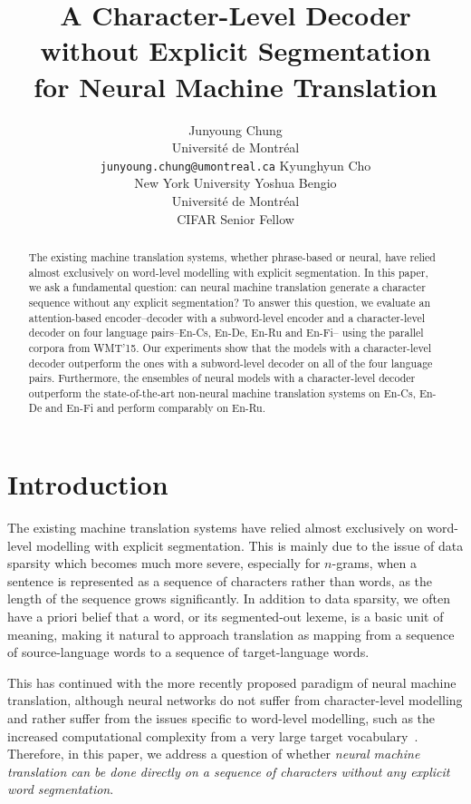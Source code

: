 \documentclass[11pt]{article}
\title{A Character-Level Decoder without Explicit Segmentation\\ 
       for Neural Machine Translation}
\author{Junyoung Chung \\
        Universit\'e de Montr\'eal \\
        {\small \texttt{junyoung.chung@umontreal.ca}}
	  \And
	Kyunghyun Cho \\
    New York University 
	  \And
	Yoshua Bengio \\
    Universit\'e de Montr\'eal \\
    CIFAR Senior Fellow
  }
\date{}
\begin{document}
\maketitle
\vspace*{-7mm}
\begin{abstract}
    The existing machine translation systems, whether phrase-based or neural,
    have relied almost exclusively on word-level modelling with explicit
    segmentation. In this paper, we ask a fundamental question: can neural
    machine translation generate a character sequence without any explicit
    segmentation? To answer this question, we evaluate an
    attention-based encoder--decoder with a subword-level encoder and a
    character-level decoder on four language pairs--En-Cs, En-De, En-Ru and
    En-Fi-- using the parallel corpora from WMT'15. Our experiments show that
    the models with a character-level decoder outperform the ones with a
    subword-level decoder on all of the four language pairs.
    Furthermore, the ensembles of neural models with a character-level
    decoder outperform the state-of-the-art non-neural machine translation
    systems on En-Cs, En-De and En-Fi and perform comparably on En-Ru.
\end{abstract}

\vspace*{-3mm}
\section{Introduction}
\label{sec:intro}
\vspace*{-2mm}

The existing machine translation systems have relied almost exclusively on
word-level modelling with explicit segmentation. This is mainly due to the issue
of data sparsity which becomes much more severe, especially for $n$-grams, when a sentence is represented
as a sequence of characters rather than words, as the length of the sequence
grows significantly. In addition to data sparsity, we often have a priori belief
that a word, or its segmented-out lexeme, is a basic unit of meaning, making it
natural to approach translation as mapping from a sequence of source-language words to a
sequence of target-language words.

This has continued with the more recently proposed paradigm of neural machine
translation, although neural networks do not suffer from character-level
modelling and rather suffer from the issues specific to word-level modelling,
such as the increased computational complexity from a very large target
vocabulary~\cite{jean2014using,luong2014addressing}.
Therefore, in this paper,
we address a question of whether {\em neural machine translation can be done
directly on a sequence of characters without any explicit word
segmentation}. 
\end{document}
